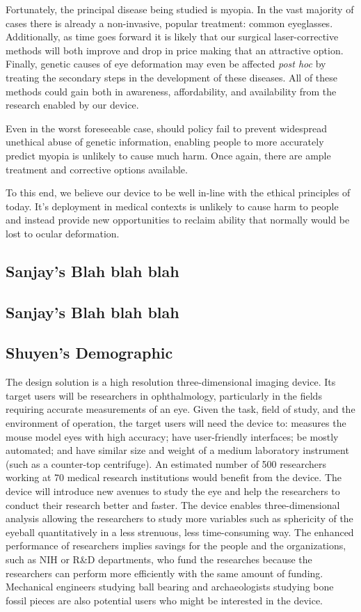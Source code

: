 \documentclass{article}
\begin{document}
Fortunately, the principal disease being studied is myopia. In the
vast majority of cases there is already a non-invasive, popular
treatment: common eyeglasses. Additionally, as time goes forward it is
likely that our surgical laser-corrective methods will both improve
and drop in price making that an attractive option. Finally, genetic
causes of eye deformation may even be affected \textit{post hoc} by
treating the secondary steps in the development of these diseases. All
of these methods could gain both in awareness, affordability, and
availability from the research enabled by our device.

Even in the worst foreseeable case, should policy fail to prevent
widespread unethical abuse of genetic information, enabling people to
more accurately predict myopia is unlikely to cause much harm. Once
again, there are ample treatment and corrective options available.

To this end, we believe our device to be well in-line with the ethical
principles of today. It's deployment in medical contexts is unlikely
to cause harm to people and instead provide new opportunities to
reclaim ability that normally would be lost to ocular deformation.

\subsection{Sanjay's Blah blah blah}
\label{sec:blah-blah-blah}

\subsection{Sanjay's Blah blah blah}
\label{sec:blah-blah-blah}

\subsection{Shuyen's Demographic}
\label{sec:Demographic}
	The design solution is a high resolution three-dimensional imaging device. Its target users will be researchers in ophthalmology, particularly in the fields requiring accurate measurements of an eye. Given the task, field of study, and the environment of operation, the target users will need the device to: measures the mouse model eyes with high accuracy; have user-friendly interfaces; be mostly automated; and have similar size and weight of a medium laboratory instrument (such as a counter-top centrifuge). An estimated number of 500 researchers working at 70 medical research institutions would benefit from the device. The device will introduce new avenues to study the eye and help the researchers to conduct their research better and faster. The device enables three-dimensional analysis allowing the researchers to study more variables such as sphericity of the eyeball quantitatively in a less strenuous, less time-consuming way. The enhanced performance of researchers implies savings for the people and the organizations, such as NIH or R\&D departments, who fund the researches because the researchers can perform more efficiently with the same amount of funding. Mechanical engineers studying ball bearing and archaeologists studying bone fossil pieces are also potential users who might be interested in the device.
	
\end{document}
